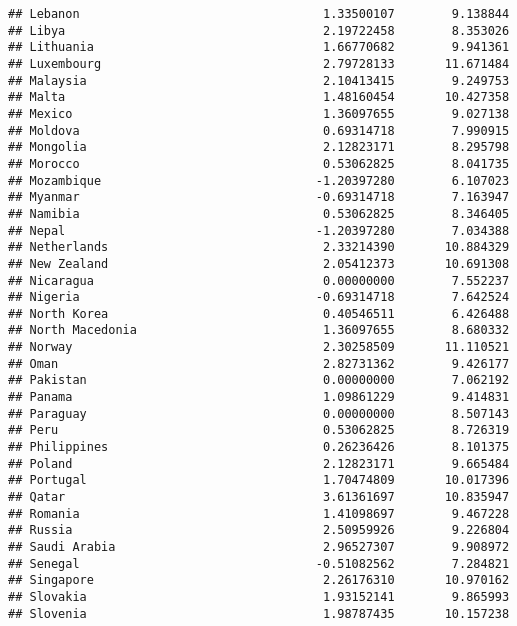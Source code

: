 \documentclass[
]{article}
\begin{document}
\begin{verbatim}
## Lebanon                                  1.33500107        9.138844
## Libya                                    2.19722458        8.353026
## Lithuania                                1.66770682        9.941361
## Luxembourg                               2.79728133       11.671484
## Malaysia                                 2.10413415        9.249753
## Malta                                    1.48160454       10.427358
## Mexico                                   1.36097655        9.027138
## Moldova                                  0.69314718        7.990915
## Mongolia                                 2.12823171        8.295798
## Morocco                                  0.53062825        8.041735
## Mozambique                              -1.20397280        6.107023
## Myanmar                                 -0.69314718        7.163947
## Namibia                                  0.53062825        8.346405
## Nepal                                   -1.20397280        7.034388
## Netherlands                              2.33214390       10.884329
## New Zealand                              2.05412373       10.691308
## Nicaragua                                0.00000000        7.552237
## Nigeria                                 -0.69314718        7.642524
## North Korea                              0.40546511        6.426488
## North Macedonia                          1.36097655        8.680332
## Norway                                   2.30258509       11.110521
## Oman                                     2.82731362        9.426177
## Pakistan                                 0.00000000        7.062192
## Panama                                   1.09861229        9.414831
## Paraguay                                 0.00000000        8.507143
## Peru                                     0.53062825        8.726319
## Philippines                              0.26236426        8.101375
## Poland                                   2.12823171        9.665484
## Portugal                                 1.70474809       10.017396
## Qatar                                    3.61361697       10.835947
## Romania                                  1.41098697        9.467228
## Russia                                   2.50959926        9.226804
## Saudi Arabia                             2.96527307        9.908972
## Senegal                                 -0.51082562        7.284821
## Singapore                                2.26176310       10.970162
## Slovakia                                 1.93152141        9.865993
## Slovenia                                 1.98787435       10.157238

\end{verbatim}
\end{document}
